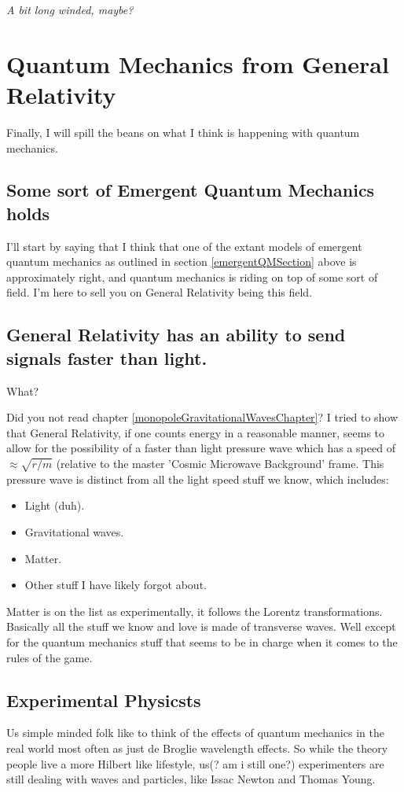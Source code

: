 \documentclass[../rzero]{subfiles}
\begin{document}
\textit{A bit long winded, maybe? }

\section{Quantum Mechanics from General Relativity}
Finally, I will spill the beans on what I think is happening with quantum mechanics. 

\subsection{Some sort of Emergent Quantum Mechanics holds}
I'll start by saying that I think that one of the extant models of emergent quantum mechanics as outlined in section \ref{emergentQMSection} above is approximately right, and quantum mechanics is riding on top of some sort of field. I'm here to sell you on General Relativity being this field. 

\subsection{General Relativity has an ability to send signals faster than light.}
What? 

Did you not read chapter \ref{monopoleGravitationalWavesChapter}? I tried to show that General Relativity, if one counts energy in a reasonable manner, seems to allow for the possibility of a faster than light pressure wave which has a speed of $\approx \sqrt{r/m}$ (relative to the master 'Cosmic Microwave Background' frame. This pressure wave is distinct from all the light speed stuff we know, which includes:

\begin{itemize}
  \item Light (duh).
  \item Gravitational waves.
  \item Matter.
  \item Other stuff I have likely forgot about.
\end{itemize}

Matter is on the list as experimentally, it follows the Lorentz transformations. Basically all the stuff we know and love is made of transverse waves. Well except for the quantum mechanics stuff that seems to be in charge when it comes to the rules of the game. 

\subsection{Experimental Physicsts}
Us simple minded folk\cite{instituteforadvancedstudySpacetimeQuantumMechanics2021} like to think of the effects of quantum mechanics in the real world most often as just de Broglie wavelength effects. So while the theory people live a more Hilbert like lifestyle, us(? am i still one?) experimenters are still dealing with waves and particles, like Issac Newton and Thomas Young. 
\end{document}
